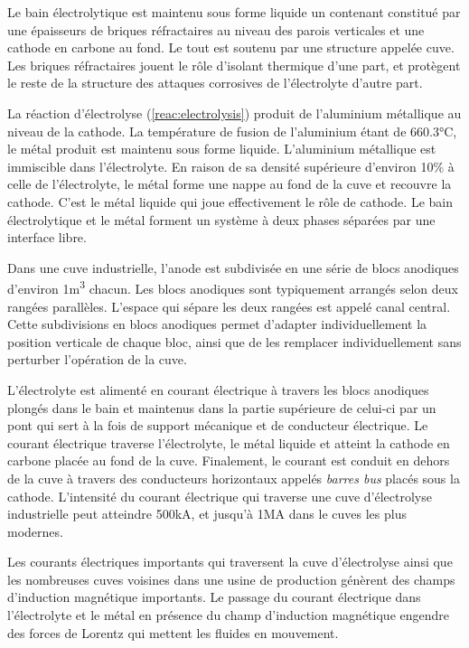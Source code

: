 Le bain électrolytique est maintenu sous forme liquide un contenant
constitué par une épaisseurs de briques réfractaires au niveau des
parois verticales et une cathode en carbone au fond. Le tout est
soutenu par une structure appelée cuve. Les briques réfractaires
jouent le rôle d'isolant thermique d'une part, et protègent le reste
de la structure des attaques corrosives de l'électrolyte d'autre part.

La réaction d'électrolyse (\ref{reac:electrolysis}) produit de
l'aluminium métallique au niveau de la cathode. La température de
fusion de l'aluminium étant de \num{660.3}\si{\celsius}, le métal
produit est maintenu sous forme liquide. L'aluminium métallique est
immiscible dans l'électrolyte. En raison de sa densité supérieure
d'environ \num{10}\% à celle de l'électrolyte, le métal forme une
nappe au fond de la cuve et recouvre la cathode. C'est le métal
liquide qui joue effectivement le rôle de cathode. Le bain
électrolytique et le métal forment un système à deux phases séparées
par une interface libre.

Dans une cuve industrielle, l'anode est subdivisée en une série de
blocs anodiques d'environ \num{1}\si{\cubic\meter} chacun. Les blocs
anodiques sont typiquement arrangés selon deux rangées
parallèles. L'espace qui sépare les deux rangées est appelé canal
central. Cette subdivisions en blocs anodiques permet d'adapter
individuellement la position verticale de chaque bloc, ainsi que de
les remplacer individuellement sans perturber l'opération de la cuve.

L'électrolyte est alimenté en courant électrique à travers les blocs
anodiques plongés dans le bain et maintenus dans la partie supérieure
de celui-ci par un pont qui sert à la fois de support mécanique et de
conducteur électrique. Le courant électrique traverse l'électrolyte,
le métal liquide et atteint la cathode en carbone placée au fond de la
cuve. Finalement, le courant est conduit en dehors de la cuve à
travers des conducteurs horizontaux appelés {\em barres bus} placés
sous la cathode. L'intensité du courant électrique qui traverse une
cuve d'électrolyse industrielle peut atteindre
\num{500}\si{\kilo\ampere}, et jusqu'à \num{1}\si{\mega\ampere} dans
le cuves les plus modernes.

Les courants électriques importants qui traversent la cuve
d'électrolyse ainsi que les nombreuses cuves voisines dans une usine
de production génèrent des champs d'induction magnétique
importants. Le passage du courant électrique dans l'électrolyte et le
métal en présence du champ d'induction magnétique engendre des forces
de Lorentz qui mettent les fluides en mouvement.

